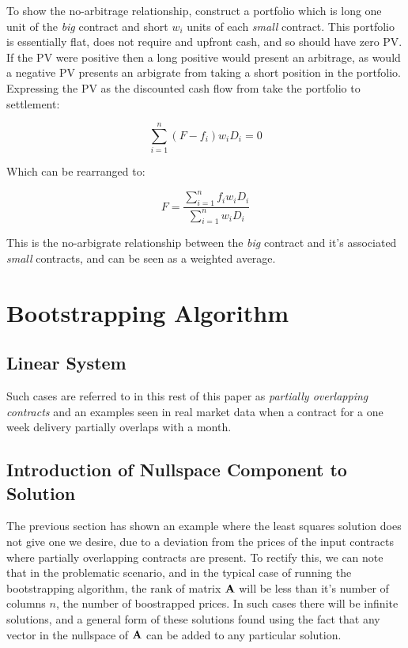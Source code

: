 \documentclass{article}
\begin{document}
To show the no-arbitrage relationship, construct a portfolio which is long one unit of the 
\emph{big} contract and short $w_i$ units of each \emph{small} contract. This portfolio
is essentially flat, does not require and upfront cash, and so should have zero PV. If
the PV were positive then a long positive would present an arbitrage, as would a 
negative PV presents an arbigrate from taking a short position in the portfolio.
Expressing the PV as the discounted cash flow from take the portfolio to settlement:

\begin{equation}
    \sum_{i=1}^{n}(F-f_i) w_i D_i = 0
\end{equation}

Which can be rearranged to:

\begin{equation}
    F = \frac{\sum_{i=1}^{n}f_i w_i D_i}{\sum_{i=1}^{n}w_i D_i}
\end{equation}

This is the no-arbigrate relationship between the \emph{big} contract and it's associated
\emph{small} contracts, and can be seen as a weighted average.

\section{Bootstrapping Algorithm}

\subsection{Linear System}


Such cases are referred to in this rest of this paper as \emph{partially overlapping contracts}
and an examples seen in real market data when a contract for a one week delivery partially
overlaps with a month.


\subsection{Introduction of Nullspace Component to Solution}
The previous section has shown an example where the least squares solution does 
not give one we desire, due to a deviation from the prices of the input contracts
where partially overlapping contracts are present.
To rectify this, we can note that in the problematic scenario, and in the typical
case of running the bootstrapping algorithm, the rank of matrix $\mathbf{A}$ will be
less than it's number of columns $n$, the number of boostrapped prices. In such
cases there will be infinite solutions, and a general form of these solutions found
using the fact that any vector in the nullspace of $\mathbf{A}$ can be added to any
particular solution.
\end{document}
